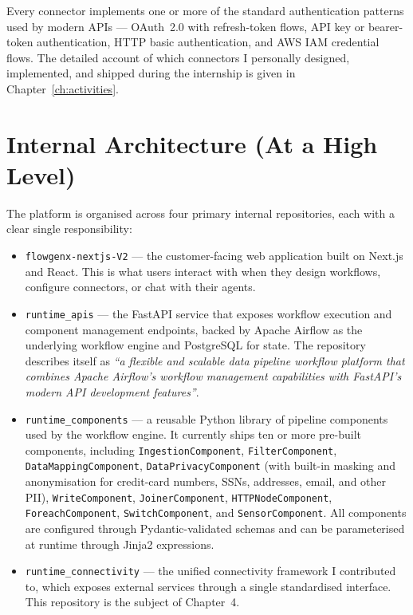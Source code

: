 Every connector implements one or more of the standard
authentication patterns used by modern APIs --- OAuth~2.0 with
refresh-token flows, API key or bearer-token authentication, HTTP
basic authentication, and AWS IAM credential flows. The detailed
account of which connectors I personally designed, implemented, and
shipped during the internship is given in Chapter~\ref{ch:activities}.

\section{Internal Architecture (At a High Level)}
\label{sec:internal-architecture}
The platform is organised across four primary internal repositories,
each with a clear single responsibility:

\begin{itemize}[leftmargin=*]
    \item \texttt{flowgenx-nextjs-V2} --- the customer-facing web
    application built on Next.js and React. This is what users
    interact with when they design workflows, configure connectors,
    or chat with their agents.

    \item \texttt{runtime\_apis} --- the FastAPI service that exposes
    workflow execution and component management endpoints, backed by
    Apache Airflow as the underlying workflow engine and PostgreSQL
    for state. The repository describes itself as
    \emph{``a flexible and scalable data pipeline workflow platform
    that combines Apache Airflow's workflow management capabilities
    with FastAPI's modern API development features''}.

    \item \texttt{runtime\_components} --- a reusable Python library
    of pipeline components used by the workflow engine. It currently
    ships ten or more pre-built components, including
    \texttt{IngestionComponent}, \texttt{FilterComponent},
    \texttt{DataMappingComponent}, \texttt{DataPrivacyComponent}
    (with built-in masking and anonymisation for credit-card numbers,
    SSNs, addresses, email, and other PII),
    \texttt{WriteComponent}, \texttt{JoinerComponent},
    \texttt{HTTPNodeComponent}, \texttt{ForeachComponent},
    \texttt{SwitchComponent}, and \texttt{SensorComponent}. All
    components are configured through Pydantic-validated schemas and
    can be parameterised at runtime through Jinja2 expressions.

    \item \texttt{runtime\_connectivity} --- the unified connectivity
    framework I contributed to, which exposes external services
    through a single standardised interface. This repository is the
    subject of Chapter~4.
\end{itemize}


